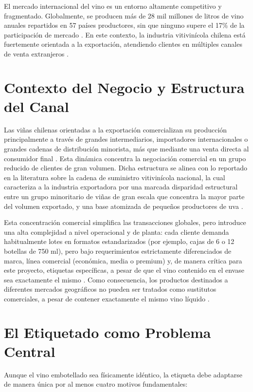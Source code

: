 El mercado internacional del vino es un entorno altamente competitivo y fragmentado. Globalmente, se producen más de 28 mil millones de litros de vino anuales repartidos en 57 países productores, sin que ninguno supere el 17\% de la participación de mercado \cite{varas2018}. En este contexto, la industria vitivinícola chilena está fuertemente orientada a la exportación, atendiendo clientes en múltiples canales de venta extranjeros \cite{varas2018}.

\section{Contexto del Negocio y Estructura del Canal\label{sec:sub1}}
Las viñas chilenas orientadas a la exportación comercializan su producción principalmente a través de grandes intermediarios, importadores internacionales o grandes cadenas de distribución minorista, más que mediante una venta directa al consumidor final \cite{bouzdine2011}. Esta dinámica concentra la negociación comercial en un grupo reducido de clientes de gran volumen. Dicha estructura se alinea con lo reportado en la literatura sobre la cadena de suministro vitivinícola nacional, la cual caracteriza a la industria exportadora por una marcada disparidad estructural entre un grupo minoritario de viñas de gran escala que concentra la mayor parte del volumen exportado, y una base atomizada de pequeños productores de uva \cite{reinecke2023}.

Esta concentración comercial simplifica las transacciones globales, pero introduce una alta complejidad a nivel operacional y de planta: cada cliente demanda habitualmente lotes en formatos estandarizados (por ejemplo, cajas de 6 o 12 botellas de 750 ml), pero bajo requerimientos estrictamente diferenciados de marca, línea comercial (económica, media o premium) y, de manera crítica para este proyecto, etiquetas específicas, a pesar de que el vino contenido en el envase sea exactamente el mismo \cite{cholette2018, varas2018}. Como consecuencia, los productos destinados a diferentes mercados geográficos no pueden ser tratados como sustitutos comerciales, a pesar de contener exactamente el mismo vino líquido \cite{cholette2009}.

\section{El Etiquetado como Problema Central\label{sec:sub2}}
Aunque el vino embotellado sea físicamente idéntico, la etiqueta debe adaptarse de manera única por al menos cuatro motivos fundamentales:

